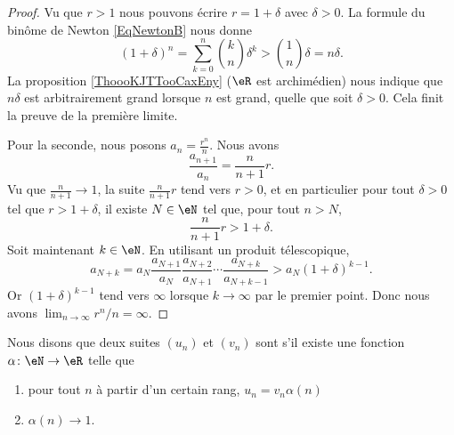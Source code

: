 \begin{proof}
    Vu que \( r>1\) nous pouvons écrire \( r=1+\delta\) avec \( \delta>0\). La formule du binôme de Newton \eqref{EqNewtonB} nous donne
    \begin{equation}
        (1+\delta)^n=\sum_{k=0}^n{k\choose n}\delta^k>{1\choose n}\delta=n\delta.
    \end{equation}
    La proposition \ref{ThoooKJTTooCaxEny} (\( \eR\) est archimédien) nous indique que \( n\delta\) est arbitrairement grand lorsque \( n\) est grand, quelle que soit \( \delta>0\). Cela finit la preuve de la première limite.

    Pour la seconde, nous posons \( a_n=\frac{ r^n }{ n }\). Nous avons
    \begin{equation}
        \frac{ a_{n+1} }{ a_n }=\frac{ n }{ n+1 }r.
    \end{equation}
    Vu que \( \frac{ n }{ n+1 }\to 1\), la suite \( \frac{ n }{ n+1 }r\) tend vers \( r>0\), et en particulier pour tout \( \delta>0\) tel que \( r>1+\delta\), il existe \( N\in \eN\) tel que, pour tout \( n > N \),
    \begin{equation}
        \frac{ n }{ n+1 }r>1+\delta.
    \end{equation}
    Soit maintenant \( k\in \eN\). En utilisant un produit télescopique,
    \begin{equation}
        a_{N+k}=a_N\frac{ a_{N+1} }{ a_N }\frac{ a_{N+2} }{ a_{N+1} }\cdots\frac{ a_{N+k} }{ a_{N+k-1} }>a_N(1+\delta)^{k-1}.
    \end{equation}
    Or \( (1+\delta)^{k-1}\) tend vers \( \infty\) lorsque \( k\to \infty\) par le premier point. Donc nous avons \( \lim_{n\to \infty} r^n/n=\infty\).
\end{proof}


\begin{definition}      \label{DEFooEWRTooKgShmT}
    Nous disons que deux suites \( (u_n)\) et \( (v_n)\) sont  s'il existe une fonction \( \alpha\colon \eN\to \eR\) telle que
    \begin{enumerate}
        \item
            pour tout \( n\) à partir d'un certain rang, \( u_n=v_n\alpha(n)\)
        \item
            \( \alpha(n)\to 1\).
    \end{enumerate}
\end{definition}

